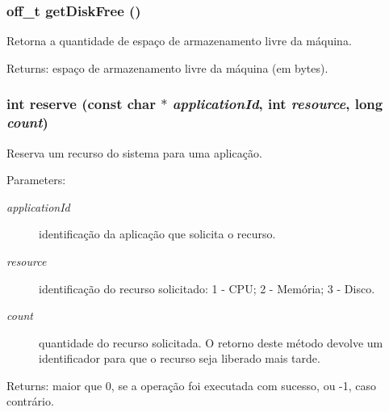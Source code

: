 \subsubsection{\setlength{\rightskip}{0pt plus 5cm}off\_\-t getDiskFree ()}\label{classbr_1_1ufscar_1_1lince_1_1ginga_1_1recommender_1_1SystemResource_18ea0665acb4e7aafa84cb99a38cd83f}


Retorna a quantidade de espaço de armazenamento livre da máquina. \begin{Desc}
\item[Returns:]espaço de armazenamento livre da máquina (em bytes). \end{Desc}
\subsubsection{\setlength{\rightskip}{0pt plus 5cm}int reserve (const char $\ast$ {\em applicationId}, int {\em resource}, long {\em count})}\label{classbr_1_1ufscar_1_1lince_1_1ginga_1_1recommender_1_1SystemResource_0ce299de4b24d1c3ce4634e618420129}


Reserva um recurso do sistema para uma aplicação. \begin{Desc}
\item[Parameters:]
\begin{description}
\item[{\em applicationId}]identificação da aplicação que solicita o recurso. \item[{\em resource}]identificação do recurso solicitado: 1 - CPU; 2 - Memória; 3 - Disco. \item[{\em count}]quantidade do recurso solicitada. O retorno deste método devolve um identificador para que o recurso seja liberado mais tarde. \end{description}
\end{Desc}
\begin{Desc}
\item[Returns:]maior que 0, se a operação foi executada com sucesso, ou -1, caso contrário. \end{Desc}
